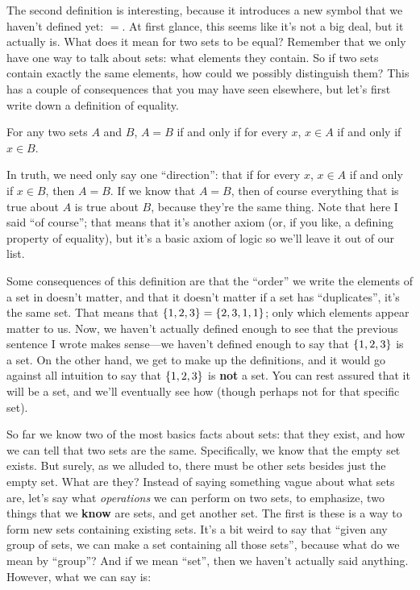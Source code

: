 The second definition is interesting, because it introduces a new symbol that we haven't defined yet: $=$.
At first glance, this seems like it's not a big deal, but it actually is.
What does it mean for two sets to be equal?
Remember that we only have one way to talk about sets: what elements they contain.
So if two sets contain exactly the same elements, how could we possibly distinguish them?
This has a couple of consequences that you may have seen elsewhere, but let's first write down a definition of equality.

\begin{axiom}[Extensionality]\label{axiom:extensionality}
    For any two sets $A$ and $B$, $A = B$ if and only if for every $x$, $x \in A$ if and only if $x \in B$.
\end{axiom}

In truth, we need only say one ``direction'': that if for every $x$, $x \in A$ if and only if $x \in B$, then $A = B$.
If we know that $A = B$, then of course everything that is true about $A$ is true about $B$, because they're the same thing.
Note that here I said ``of course''; that means that it's another axiom (or, if you like, a defining property of equality), but it's a basic axiom of logic so we'll leave it out of our list.

Some consequences of this definition are that the ``order'' we write the elements of a set in doesn't matter, and that it doesn't matter if a set has ``duplicates'', it's the same set.
That means that ${\left\{ {1,2,3} \right\}} = {\left\{ {2,3,1,1} \right\}}$; only which elements appear matter to us.
Now, we haven't actually defined enough to see that the previous sentence I wrote makes sense---we haven't defined enough to say that ${\left\{ {1,2,3} \right\}}$ is a set.
On the other hand, we get to make up the definitions, and it would go against all intuition to say that ${\left\{ {1,2,3} \right\}}$ is \textbf{not} a set.
You can rest assured that it will be a set, and we'll eventually see how (though perhaps not for that specific set). 

So far we know two of the most basics facts about sets: that they exist, and how we can tell that two sets are the same.
Specifically, we know that the empty set exists.
But surely, as we alluded to, there must be other sets besides just the empty set.
What are they?
Instead of saying something vague about what sets are, let's say what \emph{operations} we can perform on two sets, to emphasize, two things that we \textbf{know} are sets, and get another set.
The first is these is a way to form new sets containing existing sets.
It's a bit weird to say that ``given any group of sets, we can make a set containing all those sets'', because what do we mean by ``group''?
And if we mean ``set'', then we haven't actually said anything.
However, what we can say is:

